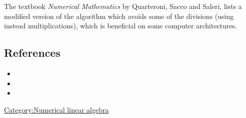\documentclass[]{article}
\begin{document}
The textbook \emph{Numerical Mathematics} by Quarteroni, Sacco and
Saleri, lists a modified version of the algorithm which avoids some of
the divisions (using instead multiplications), which is beneficial on
some computer architectures.

\subsection{References}\label{references}

\begin{itemize}
\item
\item
\item
\end{itemize}

\href{Category:Numerical_linear_algebra}{Category:Numerical linear
algebra}
\end{document}
